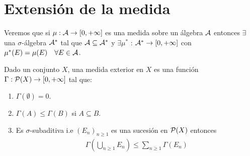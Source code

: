 \section{Extensión de la medida}

Veremos que si \(\mu: \mathcal{A} \to [0, +\infty]\) es una medida sobre un álgebra \(\mathcal{A}\) entonces \(\exists\) una \(\sigma\)-álgebra
\(\mathcal{A}^*\) tal que \(\mathcal{A} \subseteq \mathcal{A}^*\) y \(\exists \mu^*\) : \(\mathcal{A}^* \to [0, +\infty]\) con \(\mu^*(E) = \mu(E) \quad \forall E \in \mathcal{A}\).

\begin{definition}
    Dado un conjunto \(X\), una medida exterior en \(X\) es una función \(\Gamma : \mathcal{P}(X) \to [0, +\infty]\) tal que:
    \begin{enumerate}
        \item \(\Gamma(\emptyset) = 0\).
        \item \(\Gamma(A) \leq \Gamma(B)\) si \(A \subseteq B\).
        \item Es \(\sigma\)-subaditiva i.e \((E_n)_{n \geq 1}\) es una sucesión en \(\mathcal{P}(X)\) entonces \begin{align*}
                  \Gamma\left(\bigcup_{n \geq 1} E_n\right) \leq \sum_{n \geq 1} \Gamma(E_n)
              \end{align*}
    \end{enumerate}
\end{definition}

